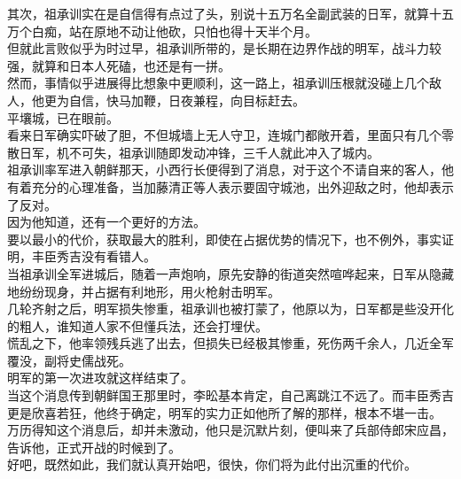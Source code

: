 \begin{multicols}{\theparacolNo}
其次，祖承训实在是自信得有点过了头，别说十五万名全副武装的日军，就算十五万个白痴，站在原地不动让他砍，只怕也得十天半个月。\\

但就此言败似乎为时过早，祖承训所带的，是长期在边界作战的明军，战斗力较强，就算和日本人死磕，也还是有一拼。\\

然而，事情似乎进展得比想象中更顺利，这一路上，祖承训压根就没碰上几个敌人，他更为自信，快马加鞭，日夜兼程，向目标赶去。\\

平壤城，已在眼前。\\

看来日军确实吓破了胆，不但城墙上无人守卫，连城门都敞开着，里面只有几个零散日军，机不可失，祖承训随即发动冲锋，三千人就此冲入了城内。\\

祖承训率军进入朝鲜那天，小西行长便得到了消息，对于这个不请自来的客人，他有着充分的心理准备，当加藤清正等人表示要固守城池，出外迎敌之时，他却表示了反对。\\

因为他知道，还有一个更好的方法。\\

要以最小的代价，获取最大的胜利，即使在占据优势的情况下，也不例外，事实证明，丰臣秀吉没有看错人。\\

当祖承训全军进城后，随着一声炮响，原先安静的街道突然喧哗起来，日军从隐藏地纷纷现身，并占据有利地形，用火枪射击明军。\\

几轮齐射之后，明军损失惨重，祖承训也被打蒙了，他原以为，日军都是些没开化的粗人，谁知道人家不但懂兵法，还会打埋伏。\\

慌乱之下，他率领残兵逃了出去，但损失已经极其惨重，死伤两千余人，几近全军覆没，副将史儒战死。\\

明军的第一次进攻就这样结束了。\\

当这个消息传到朝鲜国王那里时，李昖基本肯定，自己离跳江不远了。而丰臣秀吉更是欣喜若狂，他终于确定，明军的实力正如他所了解的那样，根本不堪一击。\\

万历得知这个消息后，却并未激动，他只是沉默片刻，便叫来了兵部侍郎宋应昌，告诉他，正式开战的时候到了。\\

好吧，既然如此，我们就认真开始吧，很快，你们将为此付出沉重的代价。\\


\end{multicols}
